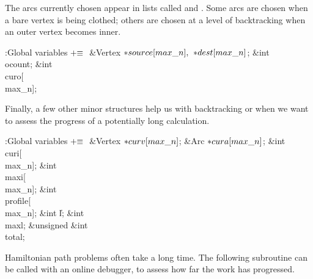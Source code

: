 The arcs currently chosen appear in lists called  and .
Some arcs are chosen when a bare vertex is being clothed; others are
chosen at a level of backtracking when an outer vertex becomes inner.

\Y\B\4:Global variables\X${}\mathrel+\equiv{}$\6
\&{Vertex} ${}{*}\\{source}[\\{max\_n}],{}$ ${}{*}\\{dest}[\\{max\_n}]{}$;\6
\&{int} \\{ocount};\6
\&{int} \\{curo}[\\{max\_n}];\par
\fi

Finally, a few other minor structures help us with backtracking or
when we want to assess the progress of a potentially long calculation.

\Y\B\4:Global variables\X${}\mathrel+\equiv{}$\6
\&{Vertex} ${}{*}\\{curv}[\\{max\_n}]{}$;\6
\&{Arc} ${}{*}\\{cura}[\\{max\_n}]{}$;\6
\&{int} \\{curi}[\\{max\_n}];\6
\&{int} \\{maxi}[\\{max\_n}];\6
\&{int} \\{profile}[\\{max\_n}];\6
\&{int} \|l;\6
\&{int} \\{maxl};\6
\&{unsigned} \&{int} \\{total};\par
\fi

Hamiltonian path problems often take a long time. The following
subroutine can be called with an online debugger, to assess how
far the work has progressed.

